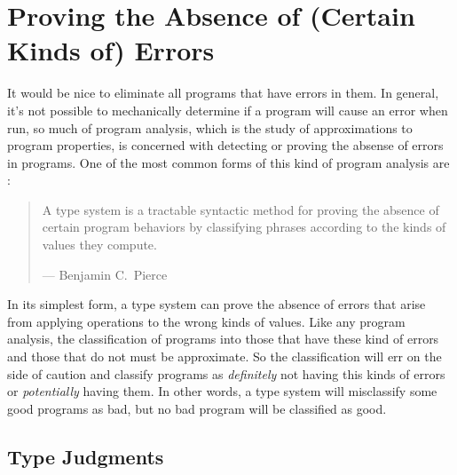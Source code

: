 \newcommand\typevaljudge[3]{{#1}\vdash{#2}:{#3}}
\newcommand\mtype{t}
\newcommand\typeof{\mathit{typeof}}
\newcommand\treduce{\mathbf{t}}
\newcommand\mtans{ta}
\newcommand\Ans{\mathit{Ans}}
\newcommand\TyAns{\mathit{TyAns}}

\newcommand\meint{i^\dagger}
\newcommand\moeint{j^\dagger}
\newcommand\mintv{\vec\mint}
\newcommand\mointv{\vec\moint}

\newcommand\BI{\mathcal{BI}}
\newcommand\ireduce{\mathbf{i}}
\newcommand\sreduce{\mathbf{s}}
\newcommand\intvdiv{\mathop\backslash}

\newcommand\mpath{\phi}
\newcommand\mcon{c}
\newcommand\msval{sv}
\newcommand\mcset{\mathcal{T}}
\newcommand\mtcons{tc}

\newcommand\allows[2][\mpath]{#1\models #2}

\section{Proving the Absence of (Certain Kinds of) Errors}

It would be nice to eliminate all programs that have errors in them.
In general, it's not possible to mechanically determine if a program
will cause an error when run, so much of program analysis, which is
the study of approximations to program properties, is concerned with
detecting or proving the absense of errors in programs.  One of the
most common forms of this kind of program analysis are :

\begin{quotation}
A type system is a tractable syntactic method for proving the absence
of certain program behaviors by classifying phrases according to the
kinds of values they compute.

\raggedleft --- Benjamin C.~Pierce
\end{quotation}

In its simplest form, a type system can prove the absence of errors
that arise from applying operations to the wrong kinds of values.  Like
any program analysis, the classification of programs into those that
have these kind of errors and those that do not must be approximate.
So the classification will err on the side of caution and classify
programs as \emph{definitely} not having this kinds of errors or
\emph{potentially} having them.  In other words, a type system will
misclassify some good programs as bad, but no bad program will be
classified as good.


\subsection{Type Judgments}\label{sec:type-judgments}


